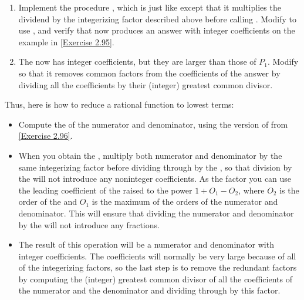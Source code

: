 \begin{exercise}
	\label{Exercise 2.96}
	\begin{enumerate}[label = \alph*., leftmargin = *]

		\item
			Implement the procedure , which is just like  except that it multiplies the dividend by the integerizing factor described above before calling .
			Modify  to use , and verify that  now produces an answer with integer coefficients on the example in \cref{Exercise 2.95}.

		\item
			The  now has integer coefficients, but they are larger than those of \( P_1 \).
			Modify  so that it removes common factors from the coefficients of the answer by dividing all the coefficients by their (integer) greatest common divisor.

	\end{enumerate}
\end{exercise}



Thus, here is how to reduce a rational function to lowest terms:
\begin{itemize}

	\item
		Compute the  of the numerator and denominator, using the version of  from \cref{Exercise 2.96}.

	\item
		When you obtain the , multiply both numerator and denominator by the same integerizing factor before dividing through by the , so that division by the  will not introduce any noninteger coefficients.
		As the factor you can use the leading coefficient of the  raised to the power \( 1 + O_1 - O_2 \), where \( O_2 \) is the order of the  and \( O_1 \) is the maximum of the orders of the numerator and denominator.
		This will ensure that dividing the numerator and denominator by the  will not introduce any fractions.

	\item
		The result of this operation will be a numerator and denominator with integer coefficients.
		The coefficients will normally be very large because of all of the integerizing factors, so the last step is to remove the redundant factors by computing the (integer) greatest common divisor of all the coefficients of the numerator and the denominator and dividing through by this factor.

\end{itemize}



